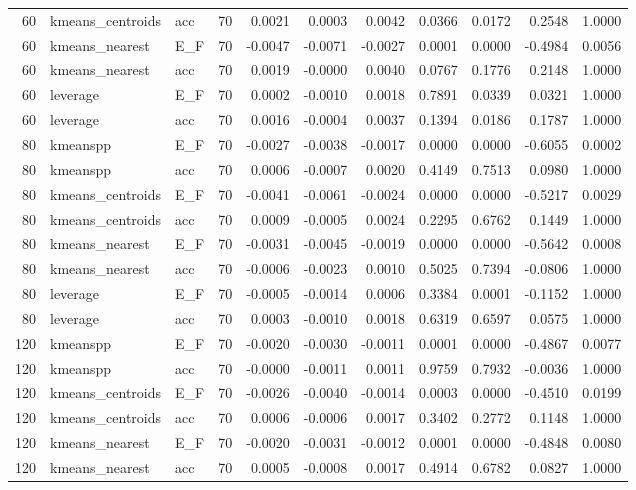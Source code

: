 \begin{table}
\begin{tabular}{rllrrrrrrrr}
60 & kmeans\_centroids & acc & 70 & 0.0021 & 0.0003 & 0.0042 & 0.0366 & 0.0172 & 0.2548 & 1.0000 \\
60 & kmeans\_nearest & E\_F & 70 & -0.0047 & -0.0071 & -0.0027 & 0.0001 & 0.0000 & -0.4984 & 0.0056 \\
60 & kmeans\_nearest & acc & 70 & 0.0019 & -0.0000 & 0.0040 & 0.0767 & 0.1776 & 0.2148 & 1.0000 \\
60 & leverage & E\_F & 70 & 0.0002 & -0.0010 & 0.0018 & 0.7891 & 0.0339 & 0.0321 & 1.0000 \\
60 & leverage & acc & 70 & 0.0016 & -0.0004 & 0.0037 & 0.1394 & 0.0186 & 0.1787 & 1.0000 \\
80 & kmeanspp & E\_F & 70 & -0.0027 & -0.0038 & -0.0017 & 0.0000 & 0.0000 & -0.6055 & 0.0002 \\
80 & kmeanspp & acc & 70 & 0.0006 & -0.0007 & 0.0020 & 0.4149 & 0.7513 & 0.0980 & 1.0000 \\
80 & kmeans\_centroids & E\_F & 70 & -0.0041 & -0.0061 & -0.0024 & 0.0000 & 0.0000 & -0.5217 & 0.0029 \\
80 & kmeans\_centroids & acc & 70 & 0.0009 & -0.0005 & 0.0024 & 0.2295 & 0.6762 & 0.1449 & 1.0000 \\
80 & kmeans\_nearest & E\_F & 70 & -0.0031 & -0.0045 & -0.0019 & 0.0000 & 0.0000 & -0.5642 & 0.0008 \\
80 & kmeans\_nearest & acc & 70 & -0.0006 & -0.0023 & 0.0010 & 0.5025 & 0.7394 & -0.0806 & 1.0000 \\
80 & leverage & E\_F & 70 & -0.0005 & -0.0014 & 0.0006 & 0.3384 & 0.0001 & -0.1152 & 1.0000 \\
80 & leverage & acc & 70 & 0.0003 & -0.0010 & 0.0018 & 0.6319 & 0.6597 & 0.0575 & 1.0000 \\
120 & kmeanspp & E\_F & 70 & -0.0020 & -0.0030 & -0.0011 & 0.0001 & 0.0000 & -0.4867 & 0.0077 \\
120 & kmeanspp & acc & 70 & -0.0000 & -0.0011 & 0.0011 & 0.9759 & 0.7932 & -0.0036 & 1.0000 \\
120 & kmeans\_centroids & E\_F & 70 & -0.0026 & -0.0040 & -0.0014 & 0.0003 & 0.0000 & -0.4510 & 0.0199 \\
120 & kmeans\_centroids & acc & 70 & 0.0006 & -0.0006 & 0.0017 & 0.3402 & 0.2772 & 0.1148 & 1.0000 \\
120 & kmeans\_nearest & E\_F & 70 & -0.0020 & -0.0031 & -0.0012 & 0.0001 & 0.0000 & -0.4848 & 0.0080 \\
120 & kmeans\_nearest & acc & 70 & 0.0005 & -0.0008 & 0.0017 & 0.4914 & 0.6782 & 0.0827 & 1.0000 \\

\end{tabular}
\end{table}
